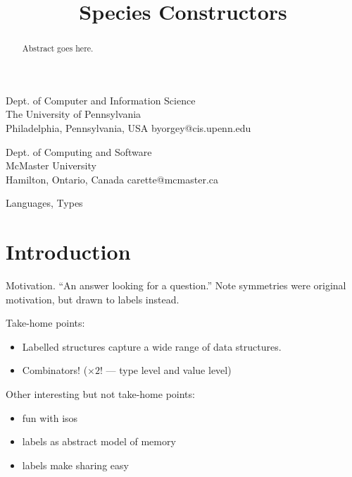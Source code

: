 \documentclass[9pt,preprint]{sigplanconf}
\begin{document}
\title{Species Constructors}

{Dept. of Computer and Information Science\\ The University of Pennsylvania\\
Philadelphia, Pennsylvania, USA}
{byorgey@cis.upenn.edu}

{Dept. of Computing and Software\\ McMaster University\\
Hamilton, Ontario, Canada}
{carette@mcmaster.ca}

\maketitle

\begin{abstract}

\begin{todo}
Abstract goes here.
\end{todo}

\end{abstract}


\terms
Languages, Types

\section{Introduction}
\label{sec:intro}

\begin{todo}
  Motivation.  ``An answer looking for a question.''  Note symmetries
  were original motivation, but drawn to labels instead.

  Take-home points:
  \begin{itemize}
  \item Labelled structures capture a wide range of data structures.
  \item Combinators! ($\times 2!$ --- type level and value level)
  \end{itemize}

  Other interesting but not take-home points:
  \begin{itemize}
  \item fun with isos
  \item labels as abstract model of memory
  \item labels make sharing easy
  \end{itemize}
\end{todo}
\end{document}
